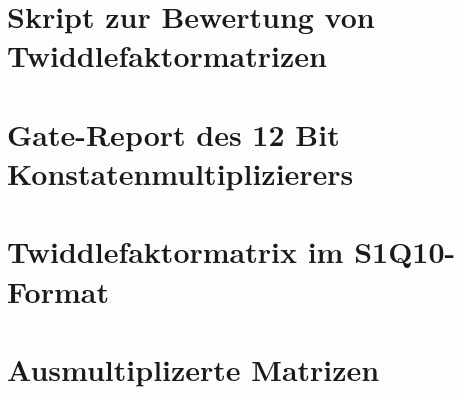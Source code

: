  \section{Skript zur Bewertung von Twiddlefaktormatrizen}
 
 
 \section{Gate-Report des 12 Bit Konstatenmultiplizierers}
 

 \section{Twiddlefaktormatrix im S1Q10-Format}
 
 
 
 
 
 
 
 \section{Ausmultiplizerte Matrizen}
 
 
